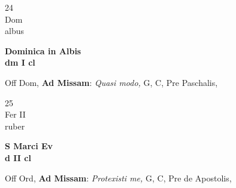 \documentclass[10pt, openany]{book}
\begin{document}
        \begin{center}
            \begin{minipage}{3.5in}
                \vspace{2em}
                \begin{minipage}{0.5in}
                    {\Huge 24} \\
                    {\normalsize Dom} \\
                    {\normalsize albus}
                \end{minipage}
                \begin{minipage}{3.0in}
                    \textbf{ \large Dominica in Albis \\
                    \textnormal{\normalsize dm I cl}} \\ 
                \end{minipage}
                \begin{justify}Off Dom, \textbf{Ad Missam}: \textit{Quasi modo,} G, C, Pre Paschalis,   
                \end{justify}
            \end{minipage}
        \end{center}
    
        \begin{center}
            \begin{minipage}{3.5in}
                \vspace{2em}
                \begin{minipage}{0.5in}
                    {\Huge 25} \\
                    {\normalsize Fer II} \\
                    {\normalsize ruber}
                \end{minipage}
                \begin{minipage}{3.0in}
                    \textbf{ \large S Marci Ev \\
                    \textnormal{\normalsize d II cl}} \\ 
                \end{minipage}
                \begin{justify}Off Ord, \textbf{Ad Missam}: \textit{Protexisti me,} G, C, Pre de Apostolis,   
                \end{justify}
            \end{minipage}
        \end{center}
    
\end{document}
